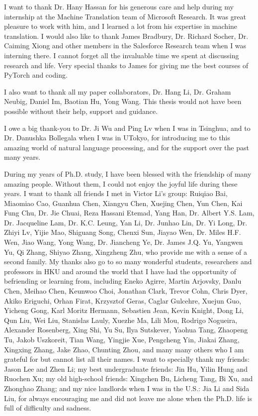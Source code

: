  I want to thank Dr. Hany Hassan for his generous care and help during my internship at the Machine Translation team of Microsoft Research. 
 It was great pleasure to work with him, and I learned a lot from his expertise in machine translation. 
 I would also like to thank James Bradbury, Dr. Richard Socher, Dr. Caiming Xiong and other members in the Salesforce Research team when I was interning there. I cannot forget all the invaluable time we spent at discussing research and life. Very special thanks to James for giving me the best courses of PyTorch and coding.
 
 I also want to thank all my paper collaborators, 
 Dr. Hang Li, 
 Dr. Graham Neubig, 
 Daniel Im,
 Baotian Hu,
 Yong Wang.
 This thesis would not have been possible without their help, support and guidance.
 
I owe a big thank-you to Dr. Ji Wu and Ping Lv when I was in Tsinghua, and to Dr. Danushka Bollegala when I was  in UTokyo, for introducing me to this amazing world of natural language processing, and for the support over the past many years.
 
During my years of Ph.D. study, I have been blessed with the friendship of many amazing people. Without them, I could not enjoy the joyful life during these years.
I want to thank all friends I met in Victor Li's group:
Ruiqiao Bai,
Miaomiao Cao,
Guanhua Chen,
Xiangyu Chen,
Xuejing Chen,
Yun Chen,
Kai Fung Chu,
Dr. Jie Chuai,
Reza Hassani Etemad,
Yang Han,
Dr. Albert Y.S. Lam,
Dr. Jacqueline Lam,
Dr. K.C. Leung,
Yan Li,
Dr. Junhao Lin,
Dr. Yi Long,
Dr. Zhiyi Lv,
Yijie Mao,
Shiguang Song,
Chenxi Sun,
Jiayao Wen,
Dr. Miles H.F. Wen,
Jiao Wang,
Yong Wang,
Dr. Jiancheng Ye,
Dr. James J.Q. Yu,
Yangwen Yu,
Qi Zhang,
Shiyao Zhang,
Xingzheng Zhu,
who provide me with a sense of a second family.
My thanks also go to so many wonderful students, researchers and professors in HKU and around the world that I have had the opportunity of befriending or learning from, including
Eneko Agirre,
Martin Arjovsky,
Danlu Chen,
Meihao Chen,
Keunwoo Choi,
Jonathan Clark,
Trevor Cohn,
Chris Dyer,
Akiko Eriguchi,
Orhan Firat,
Krzysztof Geras,
Caglar Gulcehre,
Xuejun Guo,
Yicheng Gong,
Karl Moritz Hermann,
Sebastien Jean,
Kevin Knight,
Dong Li,
Qun Liu,
Wei Liu,
Stanislas Lauly,
Xuezhe Ma,
Lili Mou,
Rodrigo Nogueira,
Alexander Rosenberg,
Xing Shi,
Yu Su,
Ilya Sutskever,
Yaohua Tang,
Zhaopeng Tu,
Jakob Uszkoreit,
Tian Wang,
Yingjie Xue,
Pengcheng Yin,
Jiakai Zhang,
Xingxing Zhang,
Jake Zhao,
Chunting Zhou,
 and many many others who I am grateful for but cannot list all their names. 
I want to specially thank my friends: Jason Lee and Zhen Li;
my best undergraduate friends: Jin Hu,  Yilin Hung and Ruochen Xu;
my old high-school friends: Xingchen Bu,  Licheng Tang, Bi Xu, and  Zhonghao Zhang;
and my nice landlords when I was in the U.S.: Jia Li and Sida Liu,
 for always encouraging me and did not leave me alone when the Ph.D. life is full of difficulty and sadness.


